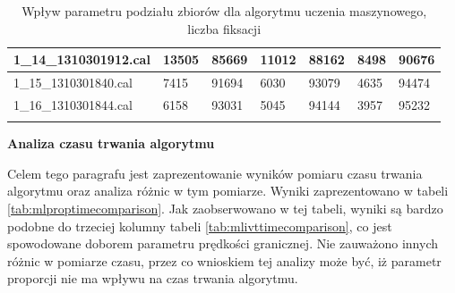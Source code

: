 {\begin{longtable}{l|l|l|l|l|l|l|}
    \multicolumn{1}{|l|}{1\_14\_1310301912.cal} & 13505 & \cellcolor[HTML]{EFEFEF}85669 & 11012 & \cellcolor[HTML]{EFEFEF}88162 & 8498 & \cellcolor[HTML]{EFEFEF}90676 \\ \hline
    \multicolumn{1}{|l|}{1\_15\_1310301840.cal} & 7415 & \cellcolor[HTML]{EFEFEF}91694 & 6030 & \cellcolor[HTML]{EFEFEF}93079 & 4635 & \cellcolor[HTML]{EFEFEF}94474 \\ \hline
    \multicolumn{1}{|l|}{1\_16\_1310301844.cal} & 6158 & \cellcolor[HTML]{EFEFEF}93031 & 5045 & \cellcolor[HTML]{EFEFEF}94144 & 3957 & \cellcolor[HTML]{EFEFEF}95232 \\ \hline
    \caption{Wpływ parametru podziału zbiorów dla algorytmu uczenia maszynowego, liczba fiksacji}
    \label{tab:mlpropfixcomparison}\\
\end{longtable}
}
\textbf{Analiza czasu trwania algorytmu}\par
Celem tego paragrafu jest zaprezentowanie wyników pomiaru czasu trwania algorytmu oraz analiza różnic w tym pomiarze. Wyniki zaprezentowano w tabeli \ref{tab:mlproptimecomparison}. Jak zaobserwowano w tej tabeli, wyniki są bardzo podobne do trzeciej kolumny tabeli \ref{tab:mlivttimecomparison}, co jest spowodowane doborem parametru prędkości granicznej. Nie zauważono innych różnic w pomiarze czasu, przez co wnioskiem tej analizy może być, iż parametr proporcji nie ma wpływu na czas trwania algorytmu.\par
